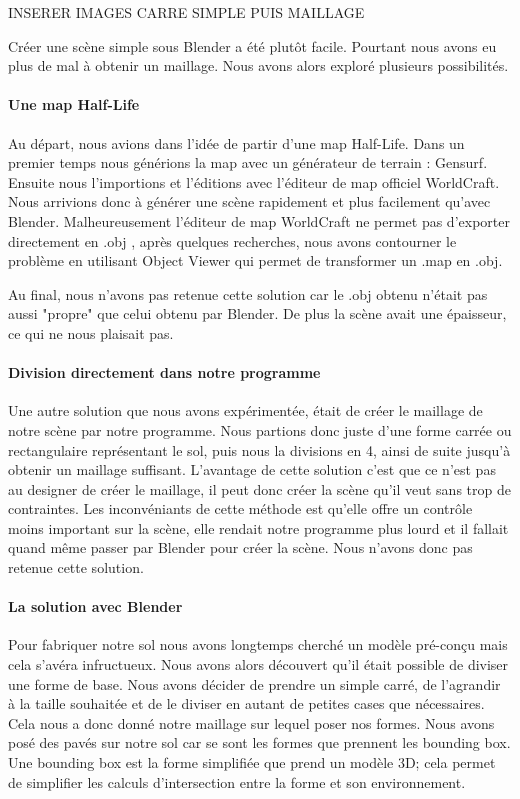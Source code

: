 \documentclass[a4paper,12pt]{report}
\begin{document}
INSERER IMAGES CARRE SIMPLE PUIS MAILLAGE

Créer une scène simple sous Blender a été plutôt facile. Pourtant nous avons eu plus de mal à obtenir un maillage. Nous avons alors exploré plusieurs possibilités.

\paragraph{Une map Half-Life}

Au départ, nous avions dans l'idée de partir d'une map Half-Life. Dans un premier temps nous générions la map avec un générateur de terrain : Gensurf. Ensuite nous l'importions et l'éditions avec l'éditeur de map officiel WorldCraft. Nous arrivions donc à générer une scène rapidement et plus facilement qu'avec Blender. 
Malheureusement l'éditeur de map WorldCraft ne permet pas d'exporter directement en .obj , après quelques recherches, nous avons contourner le problème en utilisant Object Viewer qui permet de transformer un .map en .obj.

Au final, nous n'avons pas retenue cette solution car le .obj obtenu n'était pas aussi "propre" que celui obtenu par Blender. De plus la scène avait une épaisseur, ce qui ne nous plaisait pas.

\paragraph{Division directement dans notre programme}

Une autre solution que nous avons expérimentée, était de créer le maillage de notre scène par notre programme. Nous partions donc juste d'une forme carrée ou rectangulaire représentant le sol, puis nous la divisions en 4, ainsi de suite jusqu'à obtenir un maillage suffisant.
L'avantage de cette solution c'est que ce n'est pas au designer de créer le maillage, il peut donc créer la scène qu'il veut sans trop de contraintes. Les inconvéniants de cette méthode est qu'elle offre un contrôle moins important sur la scène, elle rendait notre programme plus lourd et il fallait quand même passer par Blender pour créer la scène. Nous n'avons donc pas retenue cette solution.

\paragraph{La solution avec Blender}

Pour fabriquer notre sol nous avons longtemps cherché un modèle pré-conçu mais cela s'avéra infructueux.
Nous avons alors découvert qu'il était possible de diviser une forme de base. Nous avons décider de prendre un simple carré, de l'agrandir à la taille souhaitée et de le diviser en autant de petites cases que nécessaires. Cela nous a donc donné notre maillage sur lequel poser nos formes.
Nous avons posé des pavés sur notre sol car se sont les formes que prennent les bounding box. Une bounding box est la forme simplifiée que prend un modèle 3D; cela permet de simplifier les calculs d'intersection entre la forme et son environnement.
\end{document}
